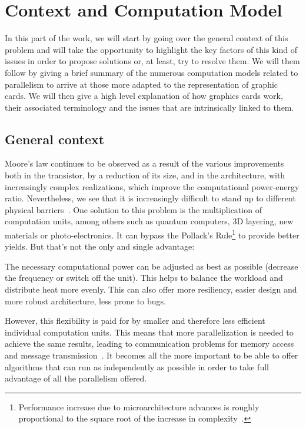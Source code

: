 
\chapter{Context and Computation Model}

In this part of the work, we will start by going over the general context of this problem and will take the opportunity to highlight the key factors of this kind of issues in order to propose solutions or, at least, try to resolve them. We will them follow by giving a brief summary of the numerous computation models related to parallelism to arrive at those more adapted to the representation of graphic cards. We will then give a high level explanation of how graphics cards work, their associated terminology and the issues that are intrinsically linked to them.

\section{General context}

Moore's law continues to be observed as a result of the various improvements both in the transistor, by a reduction of its size, and in the architecture, with increasingly complex realizations, which improve the computational power-energy ratio. Nevertheless, we see that it is increasingly difficult to stand up to different physical barriers~\cite{markov2014limits}.
One solution to this problem is the multiplication of computation units, among others such as quantum computers, 3D layering, new materials or photo-electronics. It can bypass the Pollack's Rule\footnote{Performance increase due to microarchitecture advances is roughly proportional to the square root of the increase in complexity~\cite{borkar2011future}.} to provide better yields. But that's not the only and single advantage:

The necessary computational power can be adjusted as best as possible (decrease the frequency or switch off the unit). This helps to balance the workload and distribute heat more evenly. This can also offer more resiliency, easier design and more robust architecture, less prone to bugs.

However, this flexibility is paid for by smaller and therefore less efficient individual computation units. This means that more parallelization is needed to achieve the same results, leading to communication problems for memory access and message transmission~\cite{borkar2011future}. It becomes all the more important to be able to offer algorithms that can run as independently as possible in order to take full advantage of all the parallelism offered.

